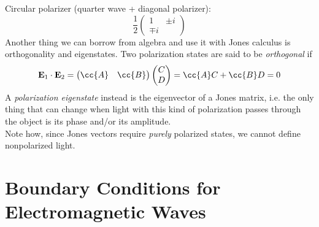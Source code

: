 \documentclass[../electromagnetism.tex]{subfiles}
\begin{document}
Circular polarizer (quarter wave + diagonal polarizer):
\begin{equation}
	\frac{1}{2}\begin{pmatrix}
		1&\pm i\\\mp i
	\end{pmatrix}
	\label{eq:qwp+lp.jpol}
\end{equation}
Another thing we can borrow from algebra and use it with Jones calculus is orthogonality and eigenstates. Two polarization states are said to be \textit{orthogonal} if
\begin{equation}
	\vec{E}_1\cdot\vec{E}_2=\begin{pmatrix}
		\cc{A}&\cc{B}
	\end{pmatrix}\begin{pmatrix}
		C\\D
	\end{pmatrix}=\cc{A}C+\cc{B}D=0
	\label{eq:orth.jpol}
\end{equation}
A \textit{polarization eigenstate} instead is the eigenvector of a Jones matrix, i.e. the only thing that can change when light with this kind of polarization passes through the object is its phase and/or its amplitude.\\
Note how, since Jones vectors require \textit{purely} polarized states, we cannot define nonpolarized light.
\section{Boundary Conditions for Electromagnetic Waves}
\end{document}
